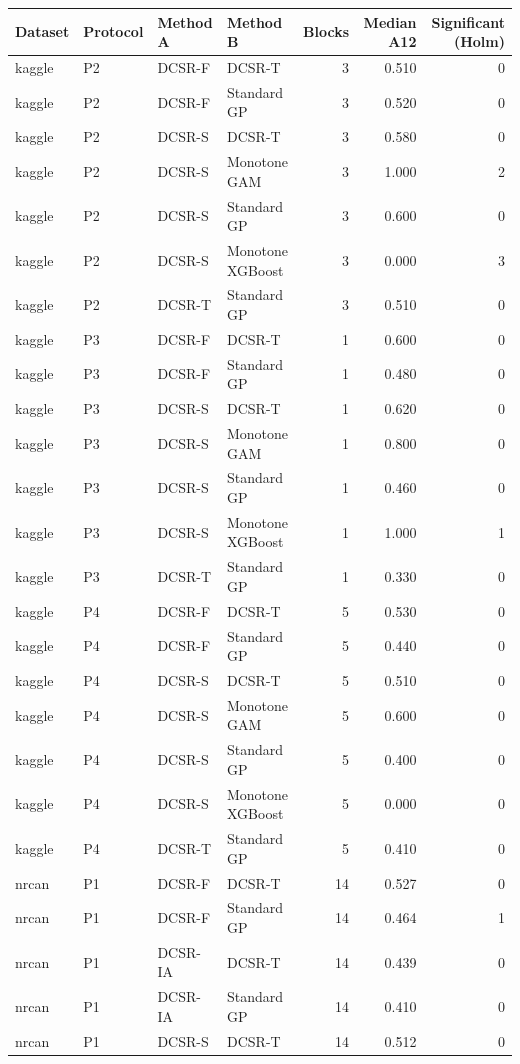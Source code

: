 \begin{tabular}{llllrrr}
\toprule
Dataset & Protocol & Method A & Method B & Blocks & Median A12 & Significant (Holm) \\
\midrule
kaggle & P2 & DCSR-F & DCSR-T & 3 & 0.510 & 0 \\
kaggle & P2 & DCSR-F & Standard GP & 3 & 0.520 & 0 \\
kaggle & P2 & DCSR-S & DCSR-T & 3 & 0.580 & 0 \\
kaggle & P2 & DCSR-S & Monotone GAM & 3 & 1.000 & 2 \\
kaggle & P2 & DCSR-S & Standard GP & 3 & 0.600 & 0 \\
kaggle & P2 & DCSR-S & Monotone XGBoost & 3 & 0.000 & 3 \\
kaggle & P2 & DCSR-T & Standard GP & 3 & 0.510 & 0 \\
kaggle & P3 & DCSR-F & DCSR-T & 1 & 0.600 & 0 \\
kaggle & P3 & DCSR-F & Standard GP & 1 & 0.480 & 0 \\
kaggle & P3 & DCSR-S & DCSR-T & 1 & 0.620 & 0 \\
kaggle & P3 & DCSR-S & Monotone GAM & 1 & 0.800 & 0 \\
kaggle & P3 & DCSR-S & Standard GP & 1 & 0.460 & 0 \\
kaggle & P3 & DCSR-S & Monotone XGBoost & 1 & 1.000 & 1 \\
kaggle & P3 & DCSR-T & Standard GP & 1 & 0.330 & 0 \\
kaggle & P4 & DCSR-F & DCSR-T & 5 & 0.530 & 0 \\
kaggle & P4 & DCSR-F & Standard GP & 5 & 0.440 & 0 \\
kaggle & P4 & DCSR-S & DCSR-T & 5 & 0.510 & 0 \\
kaggle & P4 & DCSR-S & Monotone GAM & 5 & 0.600 & 0 \\
kaggle & P4 & DCSR-S & Standard GP & 5 & 0.400 & 0 \\
kaggle & P4 & DCSR-S & Monotone XGBoost & 5 & 0.000 & 0 \\
kaggle & P4 & DCSR-T & Standard GP & 5 & 0.410 & 0 \\
nrcan & P1 & DCSR-F & DCSR-T & 14 & 0.527 & 0 \\
nrcan & P1 & DCSR-F & Standard GP & 14 & 0.464 & 1 \\
nrcan & P1 & DCSR-IA & DCSR-T & 14 & 0.439 & 0 \\
nrcan & P1 & DCSR-IA & Standard GP & 14 & 0.410 & 0 \\
nrcan & P1 & DCSR-S & DCSR-T & 14 & 0.512 & 0 \\

\end{tabular}
